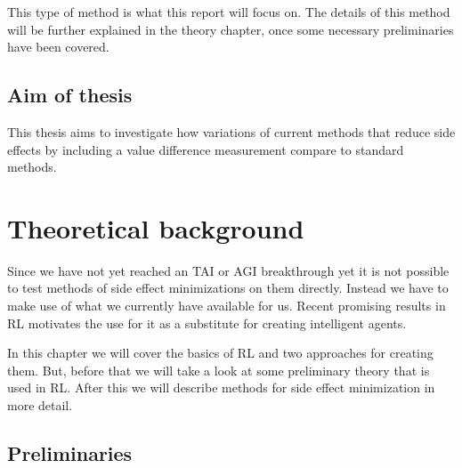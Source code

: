 \documentclass[12pt,A4]{report}
\theoremstyle{definition}
\begin{document}
This type of method is what this report will focus on. The details of this method will be further explained in the theory chapter, once some necessary preliminaries have been covered.

\section{Aim of thesis}
This thesis aims to investigate how variations of current methods that reduce side effects by including a value difference measurement compare to standard methods. 


 


\chapter{Theoretical background}
Since we have not yet reached an TAI or AGI breakthrough yet it is not possible to test methods of side effect minimizations on them directly. Instead we have to make use of what we currently have available for us. Recent promising results in RL motivates the use for it as a substitute for creating intelligent agents.

In this chapter we will cover the basics of RL and two approaches for creating them. But, before that we will take a look at some preliminary theory that is used in RL. After this we will describe methods for side effect minimization in more detail.


\section{Preliminaries}
\end{document}
